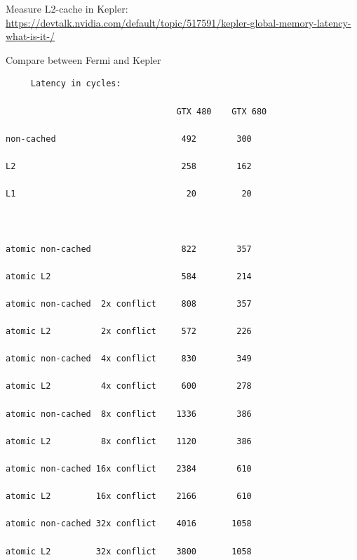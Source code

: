 Measure L2-cache in Kepler:
\url{https://devtalk.nvidia.com/default/topic/517591/kepler-global-memory-latency-what-is-it-/}


Compare between Fermi and Kepler
\begin{verbatim}
     Latency in cycles:

                                  GTX 480    GTX 680

non-cached                         492        300

L2                                 258        162

L1                                  20         20



atomic non-cached                  822        357

atomic L2                          584        214

atomic non-cached  2x conflict     808        357

atomic L2          2x conflict     572        226

atomic non-cached  4x conflict     830        349

atomic L2          4x conflict     600        278

atomic non-cached  8x conflict    1336        386

atomic L2          8x conflict    1120        386

atomic non-cached 16x conflict    2384        610

atomic L2         16x conflict    2166        610

atomic non-cached 32x conflict    4016       1058

atomic L2         32x conflict    3800       1058
\end{verbatim}

